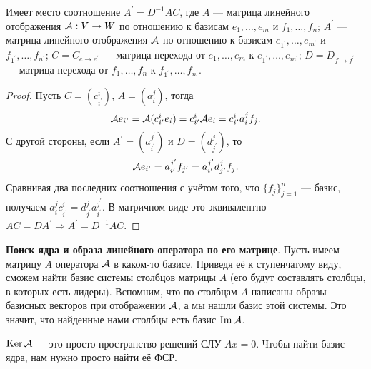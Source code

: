 \begin{theorem}
    Имеет место соотношение $A^\prime = D^{-1}AC$, где $A$ --- матрица линейного отображения $\mathcal{A}: V \to W$ по отношению к базисам $e_1, \ldots, e_m$ и $f_1, \ldots, f_n$; $A^\prime$ --- матрица линейного отображения $\mathcal{A}$ по отношению к базисам $e_{1^\prime}, \ldots, e_{m^\prime}$ и $f_{1^\prime}, \ldots, f_{n^\prime}$; $C = C_{e \to e^\prime}$ --- матрица перехода от $e_1, \ldots, e_m$ к $e_{1^\prime}, \ldots, e_{m^\prime}$; $D = D_{f \to f^\prime}$ --- матрица перехода от $f_1, \ldots, f_n$ к $f_{1^\prime}, \ldots, f_{n^\prime}$.
\end{theorem}

\begin{proof}
    Пусть $C = (c^i_{i^\prime})$, $A = (a^j_i)$, тогда \[\mathcal{A} e_{i^\prime} = \mathcal{A}(c^i_{i^\prime}e_i) = c^i_{i^\prime}\mathcal{A} e_i = c^i_{i^\prime}a^j_if_j.\]
    С другой стороны, если $A^\prime = (a^{j^\prime}_{i^\prime})$ и $D = (d^j_{j^\prime})$, то \[\mathcal{A} e_{i^\prime} = a^{j^\prime}_{i^\prime}f_{j^\prime} = a^{j^\prime}_{i^\prime}d^j_{j^\prime}f_j.\]
    Сравнивая два последних соотношения с учётом того, что $\{f_j\}_{j = 1}^n$ --- базис, получаем $a^j_ic^i_{i^\prime} = d^j_{j^\prime}a^{j^\prime}_{i^\prime}$. В матричном виде это эквивалентно $AC = DA^\prime \Rightarrow A^\prime = D^{-1}AC$.
\end{proof}

\textbf{Поиск ядра и образа линейного оператора по его матрице}. Пусть имеем матрицу $A$ оператора $\mathcal{A}$ в каком-то базисе. Приведя её к ступенчатому виду, сможем найти базис системы столбцов матрицы $A$ (его будут составлять столбцы, в которых есть лидеры). Вспомним, что по столбцам $A$ написаны образы базисных векторов при отображении $\mathcal{A}$, а мы нашли базис этой системы. Это значит, что найденные нами столбцы есть базис $\operatorname{Im}\mathcal{A}$.

$\operatorname{Ker}\mathcal{A}$ --- это просто пространство решений СЛУ $Ax = 0$. Чтобы найти базис ядра, нам нужно просто найти её ФСР.

